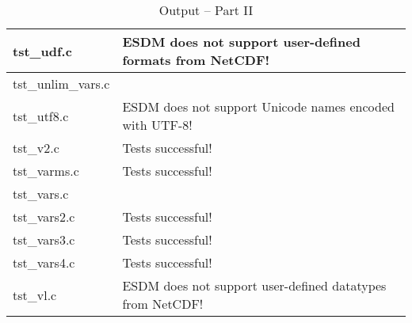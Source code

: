 \begin{table}[H]
\begin{tabular}{|l|l|}
tst\_udf.c   &   ESDM does not support user-defined formats from NetCDF!   \\ \hline
tst\_unlim\_vars.c   &       \\ \hline
tst\_utf8.c   &   ESDM does not support Unicode names encoded with UTF-8!  \\ \hline
tst\_v2.c   &    Tests successful!   \\ \hline
tst\_varms.c   &  Tests successful!    \\ \hline
tst\_vars.c   &      \\ \hline
tst\_vars2.c   &  Tests successful!  \\ \hline
tst\_vars3.c   &  Tests successful!     \\ \hline
tst\_vars4.c   &  Tests successful!     \\ \hline
tst\_vl.c   &   ESDM does not support user-defined datatypes from NetCDF!    \\ \hline
\hline
\end{tabular}
\caption{Output -- Part II}
\end{table}

